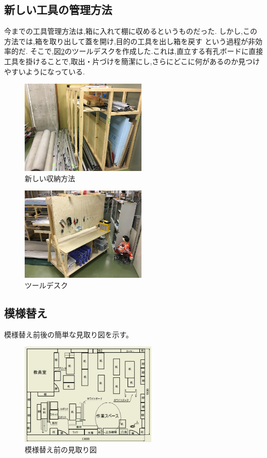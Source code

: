 \documentclass[twocolumn,11pt]{abst}
\begin{document}
\subsection{新しい工具の管理方法}
今までの工具管理方法は,箱に入れて棚に収めるというものだった.
しかし,この方法では,箱を取り出して蓋を開け,目的の工具を出し箱を戻す
という過程が非効率的だ.
そこで,図\ref{tooldesk}のツールデスクを作成した.これは,直立する有孔ボードに直接
工具を掛けることで,取出・片づけを簡潔にし,さらにどこに何があるのか見つけ
やすいようになっている.

\begin{figure}[htbp]
  \begin{center}
   \includegraphics[width=60mm]{newmaterial.png}
  \end{center}
 \caption{新しい収納方法}
\label{newmaterial}
\end{figure}

\begin{figure}[htbp]
  \begin{center}
   \includegraphics[width=60mm]{tooldesk.png}
  \end{center}
 \caption{ツールデスク}
\label{tooldesk}
\end{figure}


\subsection{模様替え}
模様替え前後の簡単な見取り図を示す。
\begin{figure}[htbp]
  \begin{center}
   \includegraphics[width=65mm]{beforcad.png}
  \end{center}
 \caption{模様替え前の見取り図}
\label{befor}
\end{figure}
\end{document}
